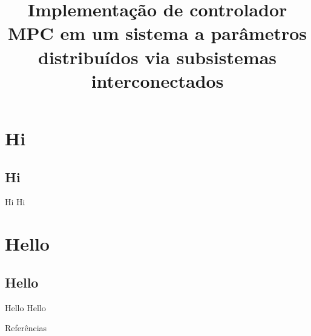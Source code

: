 \documentclass[abnt,pt]{slides}
\title{Implementação de controlador MPC em um sistema a parâmetros distribuídos via subsistemas interconectados}
\begin{document}
    \maketitle{}

    \begin{slide}
        \vfill\null{}
        \begin{minipage}[t][0.6\textheight][t]{.5\textwidth}
            \tableofcontents[sections={1-3}]
        \end{minipage}%
        \begin{minipage}[t][4\baselineskip][t]{.5\textwidth}
            \tableofcontents[sections={4-}]
        \end{minipage}
        \vfill\null{}
    \end{slide}

    \section{Hi}
    \subsection{Hi}

    \begin{slide}{Hi}
        Hi
    \end{slide}

    \section{Hello}
    \subsection{Hello}

    \begin{slide}{Hello}
        Hello
    \end{slide}

    \begin{frame}[allowframebreaks]{Referências}
        \nocite{*}
        \printbibliography{}
    \end{frame}
\end{document}
